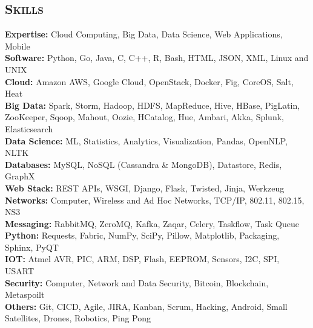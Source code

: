 \begin{resume}


\section{\textsc{Skills}}
{\bf Expertise:} Cloud Computing, Big Data, Data Science, Web Applications, Mobile
\\ {\bf Software:} Python, Go, Java, C, C++, R, Bash, HTML, JSON, XML, Linux and UNIX
\\ {\bf Cloud:} Amazon AWS, Google Cloud, OpenStack, Docker, Fig, CoreOS, Salt, Heat
\\ {\bf Big Data:} Spark, Storm, Hadoop, HDFS, MapReduce, Hive, HBase, PigLatin, ZooKeeper, Sqoop, Mahout, Oozie, HCatalog, Hue, Ambari, Akka, Splunk, Elasticsearch
\\ {\bf Data Science:} ML, Statistics, Analytics, Visualization, Pandas, OpenNLP, NLTK
\\ {\bf Databases:} MySQL, NoSQL (Cassandra \& MongoDB), Datastore, Redis, GraphX
\\ {\bf Web Stack:} REST APIs, WSGI, Django, Flask, Twisted, Jinja, Werkzeug 
\\ {\bf Networks:} Computer, Wireless and Ad Hoc Networks, TCP/IP, 802.11, 802.15, NS3
\\ {\bf Messaging:} RabbitMQ, ZeroMQ, Kafka, Zaqar, Celery, Taskflow, Task Queue
\\ {\bf Python:} Requests, Fabric, NumPy, SciPy, Pillow, Matplotlib, Packaging, Sphinx, PyQT
\\ {\bf IOT:} Atmel AVR, PIC, ARM, DSP, Flash, EEPROM, Sensors, I2C, SPI, USART
\\ {\bf Security:} Computer, Network and Data Security, Bitcoin, Blockchain, Metaspoilt
\\ {\bf Others:} Git, CICD, Agile, JIRA, Kanban, Scrum, Hacking, Android, Small Satellites, Drones, Robotics, Ping Pong


\end{resume}
